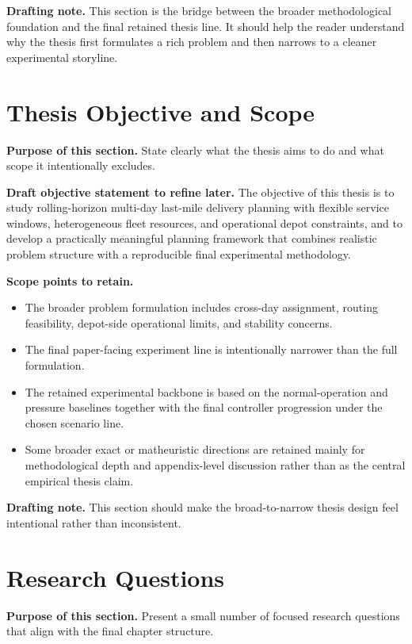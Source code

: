 \textbf{Drafting note.}
This section is the bridge between the broader methodological foundation and the final retained thesis line.
It should help the reader understand why the thesis first formulates a rich problem and then narrows to a cleaner experimental storyline.

\section{Thesis Objective and Scope}
\label{sec:intro:objective}

\textbf{Purpose of this section.}
State clearly what the thesis aims to do and what scope it intentionally excludes.

\textbf{Draft objective statement to refine later.}
The objective of this thesis is to study rolling-horizon multi-day last-mile delivery planning with flexible service windows, heterogeneous fleet resources, and operational depot constraints, and to develop a practically meaningful planning framework that combines realistic problem structure with a reproducible final experimental methodology.

\textbf{Scope points to retain.}
\begin{itemize}
    \item The broader problem formulation includes cross-day assignment, routing feasibility, depot-side operational limits, and stability concerns.
    \item The final paper-facing experiment line is intentionally narrower than the full formulation.
    \item The retained experimental backbone is based on the normal-operation and pressure baselines together with the final controller progression under the chosen scenario line.
    \item Some broader exact or matheuristic directions are retained mainly for methodological depth and appendix-level discussion rather than as the central empirical thesis claim.
\end{itemize}

\textbf{Drafting note.}
This section should make the broad-to-narrow thesis design feel intentional rather than inconsistent.

\section{Research Questions}
\label{sec:intro:questions}

\textbf{Purpose of this section.}
Present a small number of focused research questions that align with the final chapter structure.

